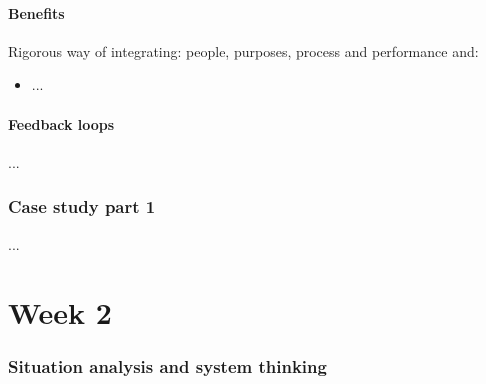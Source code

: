 \documentclass{article}
\begin{document}
\subsection{Benefits}
Rigorous way of integrating: people, purposes, process and performance and:
\begin{itemize}
    \item ...
\end{itemize}

\subsection{Feedback loops}
...

\section{Case study part 1}
...

\part{Week 2}
\section{Situation analysis and system thinking}
\end{document}

